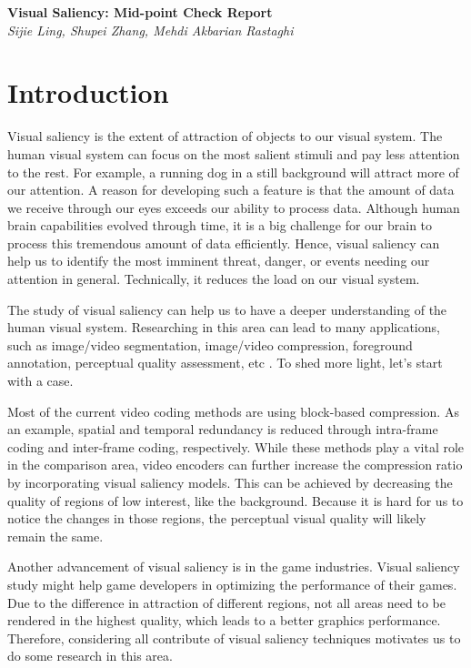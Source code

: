 \documentclass[12pt]{article}
\begin{document}
\begin{center}
{\bf \Large Visual Saliency: Mid-point Check Report}  \\
\vspace{.1in}
{\em Sijie Ling, Shupei Zhang, Mehdi Akbarian Rastaghi}
\end{center}
\section{Introduction}

Visual saliency is the extent of attraction of objects to our visual system. 
The human visual system can focus on the most salient stimuli and pay less attention to the rest. 
For example, a running dog in a still background will attract more of our attention. 
A reason for developing such a feature is that the amount of data we receive through our eyes exceeds our ability to process data. 
Although human brain capabilities evolved through time, it is a big challenge for our brain to process this tremendous amount of data efficiently. 
Hence, visual saliency can help us to identify the most imminent threat, danger, or events needing our attention in general. 
Technically, it reduces the load on our visual system. 

The study of visual saliency can help us to have a deeper understanding of the human visual system. 
Researching in this area can lead to many applications, such as image/video segmentation, image/video compression, foreground annotation, perceptual quality assessment, etc \cite{congReviewVisualSaliency2019}.  
To shed more light, let's start with a case. 

Most of the current video coding methods are using block-based compression. 
As an example, spatial and temporal redundancy is reduced through intra-frame coding and inter-frame coding, respectively\cite{sullivanOverviewHighEfficiency2012}. 
While these methods play a vital role in the comparison area, video encoders can further increase the compression ratio by incorporating visual saliency models. 
This can be achieved by decreasing the quality of regions of low interest, like the background. 
Because it is hard for us to notice the changes in those regions, the perceptual visual quality will likely remain the same.

Another advancement of visual saliency is in the game industries. 
Visual saliency study might help game developers in optimizing the performance of their games. 
Due to the difference in attraction of different regions, not all areas need to be rendered in the highest quality, which leads to a better graphics performance. 
Therefore, considering all contribute of visual saliency techniques motivates us to do some research in this area. 
\end{document}

